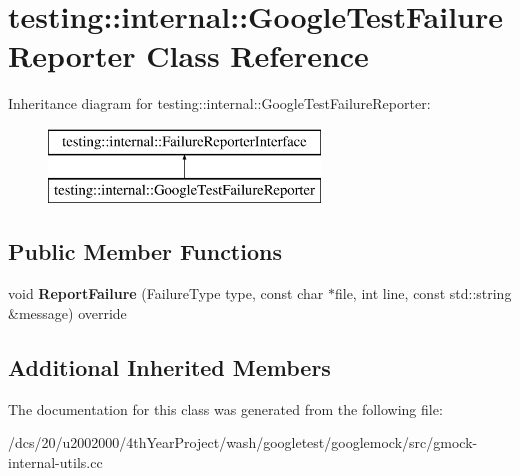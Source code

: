 \hypertarget{classtesting_1_1internal_1_1GoogleTestFailureReporter}{}\section{testing\+:\+:internal\+:\+:Google\+Test\+Failure\+Reporter Class Reference}
\label{classtesting_1_1internal_1_1GoogleTestFailureReporter}
Inheritance diagram for testing\+:\+:internal\+:\+:Google\+Test\+Failure\+Reporter\+:\begin{figure}[H]
\begin{center}
\leavevmode
\includegraphics[height=2.000000cm]{classtesting_1_1internal_1_1GoogleTestFailureReporter}
\end{center}
\end{figure}
\subsection*{Public Member Functions}
\begin{DoxyCompactItemize}
\item 
\mbox{\label{classtesting_1_1internal_1_1GoogleTestFailureReporter_aff7bfa8521e770d718172c99c807ec39}} 
void {\bfseries Report\+Failure} (Failure\+Type type, const char $\ast$file, int line, const std\+::string \&message) override
\end{DoxyCompactItemize}
\subsection*{Additional Inherited Members}


The documentation for this class was generated from the following file\+:\begin{DoxyCompactItemize}
\item 
/dcs/20/u2002000/4th\+Year\+Project/wash/googletest/googlemock/src/gmock-\/internal-\/utils.\+cc\end{DoxyCompactItemize}
